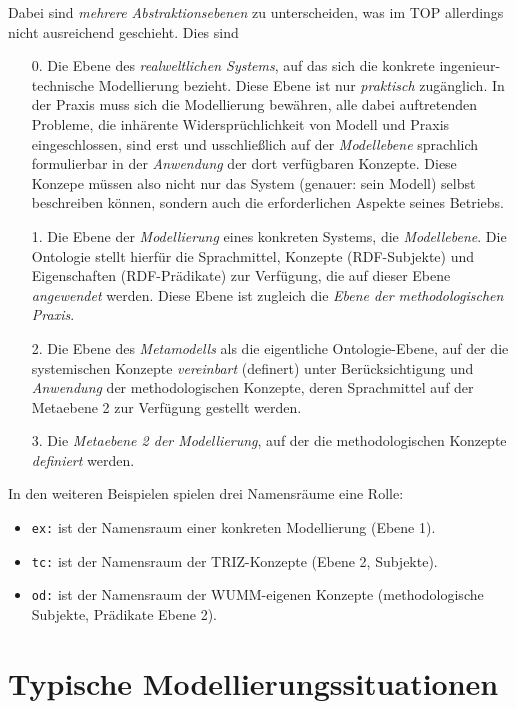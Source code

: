 \documentclass[11pt,a4paper]{article}
\begin{document}
Dabei sind \emph{mehrere Abstraktionsebenen} zu unterscheiden, was im TOP
allerdings nicht ausreichend geschieht. Dies sind
\begin{itemize}[noitemsep]
\item [0.] Die Ebene des \emph{realweltlichen Systems}, auf das sich die
  konkrete ingenieur-technische Modellierung bezieht. Diese Ebene ist nur
  \emph{praktisch} zugänglich. In der Praxis muss sich die Modellierung
  bewähren, alle dabei auftretenden Probleme, die inhärente
  Widersprüchlichkeit von Modell und Praxis eingeschlossen, sind erst  und
  usschließlich auf der \emph{Modellebene} sprachlich formulierbar in der
  \emph{Anwendung} der dort verfügbaren Konzepte.  Diese Konzepe müssen also
  nicht nur das System (genauer: sein Modell) selbst beschreiben können,
  sondern auch die erforderlichen Aspekte seines Betriebs.
\item [1.] Die Ebene der \emph{Modellierung} eines konkreten Systems, die
  \emph{Modellebene}. Die Ontologie stellt hierfür die Sprachmittel, Konzepte
  (RDF-Subjekte) und Eigenschaften (RDF-Prädikate) zur Verfügung, die auf
  dieser Ebene \emph{angewendet} werden. Diese Ebene ist zugleich die
  \emph{Ebene der methodologischen Praxis}. 
\item [2.] Die Ebene des \emph{Metamodells} als die eigentliche
  Ontologie-Ebene, auf der die systemischen Konzepte \emph{vereinbart}
  (definert) unter Berücksichtigung und \emph{Anwendung} der methodologischen
  Konzepte, deren Sprachmittel auf der Metaebene 2 zur Verfügung gestellt
  werden. 
\item [3.] Die \emph{Metaebene 2 der Modellierung}, auf der die
  methodologischen Konzepte \emph{definiert} werden.  
\end{itemize}

In den weiteren Beispielen spielen drei Namensräume eine Rolle:
\begin{itemize}[noitemsep]
\item \texttt{ex:} ist der Namensraum einer konkreten Modellierung (Ebene 1). 
\item \texttt{tc:} ist der Namensraum der TRIZ-Konzepte (Ebene 2, Subjekte).
\item \texttt{od:} ist der Namensraum der WUMM-eigenen Konzepte
  (methodologische Subjekte, Prädikate Ebene 2). 
\end{itemize}

\section{Typische Modellierungssituationen}
\end{document}
